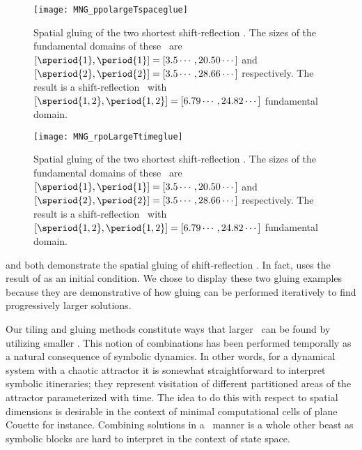 \begin{figure}
\centering
\begin{minipage}[height=.4\textheight]{.66\textwidth}
\centering
\texttt{[image: MNG\_ppolargeTspaceglue]}
\end{minipage}
\caption{ \label{fig:MNGppo12spaceglue1}
Spatial gluing of the two shortest shift-reflection
\twots. The sizes of the fundamental domains of these
\twots\ are
$[\speriod{1},\period{1}]=[3.5\cdots,20.50\cdots]$
and
$[\speriod{2},\period{2}]=[3.5\cdots,28.66\cdots]$
respectively.
The result is a
shift-reflection \twot\ with
$[\speriod{1,2},\period{1,2}]=[6.79\cdots,24.82\cdots]$
fundamental domain.
}
\end{figure}


\begin{figure}
\centering
\begin{minipage}[height=.4\textheight]{.66\textwidth}
\centering
\texttt{[image: MNG\_rpoLargeTtimeglue]}
\end{minipage}
\caption{ \label{fig:MNGppo12spaceglue2}
Spatial gluing of the two shortest shift-reflection
\twots. The sizes of the fundamental domains of these
\twots\ are
$[\speriod{1},\period{1}]=[3.5\cdots,20.50\cdots]$
and
$[\speriod{2},\period{2}]=[3.5\cdots,28.66\cdots]$
respectively.
The result is a
shift-reflection \twot\ with
$[\speriod{1,2},\period{1,2}]=[6.79\cdots,24.82\cdots]$
fundamental domain.
}
\end{figure}


and 
both demonstrate the spatial gluing
of shift-reflection \twots. In fact, 
uses the result of
as an initial
condition. We chose to display these two gluing examples
because they are demonstrative of how gluing can be performed
iteratively to find progressively larger solutions.


Our tiling and gluing methods constitute ways that larger \twots\
can be found by utilizing smaller \twots. This notion of combinations
has been performed temporally\rf{DV03} as a natural
consequence of symbolic dynamics. In other words, for a dynamical system
with a chaotic attractor it is somewhat straightforward to interpret
symbolic itineraries; they represent visitation of different partitioned
areas of the attractor parameterized with time.
The idea to do this with
respect to spatial dimensions is desirable in the context of minimal
computational cells of plane Couette for instance. Combining solutions
in a \spt\ manner is a whole other beast as symbolic blocks are
hard to interpret in the context of state space.
